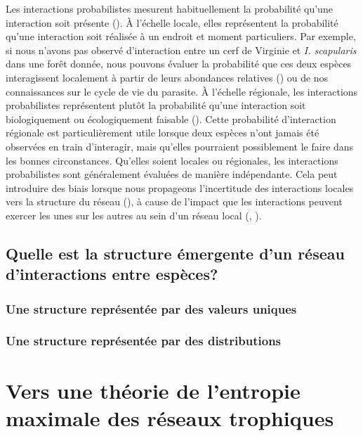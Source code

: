 Les interactions probabilistes mesurent habituellement la probabilité qu'une
interaction soit présente (\cite{Poisot2016Structure}). À l'échelle locale,
elles représentent la probabilité qu'une interaction soit réalisée à un endroit
et moment particuliers. Par exemple, si nous n'avons pas observé d'interaction
entre un cerf de Virginie et \textit{I. scapularis} dans une forêt donnée, nous
pouvons évaluer la probabilité que ces deux espèces interagissent localement à
partir de leurs abondances relatives (\cite{Canard2014Empirical}) ou de nos
connaissances sur le cycle de vie du parasite. À l'échelle régionale, les
interactions probabilistes représentent plutôt la probabilité qu'une interaction
soit biologiquement ou écologiquement faisable (\cite{Strydom2023Grapha}). Cette
probabilité d'interaction régionale est particulièrement utile lorsque deux
espèces n'ont jamais été observées en train d'interagir, mais qu'elles
pourraient possiblement le faire dans les bonnes circonstances. Qu'elles soient
locales ou régionales, les interactions probabilistes sont généralement évaluées
de manière indépendante. Cela peut introduire des biais lorsque nous propageons
l'incertitude des interactions locales vers la structure du réseau
(\cite{Poisot2016Structure}), à cause de l'impact que les interactions peuvent
exercer les unes sur les autres au sein d'un réseau local
(\cite{Golubski2011Modifying}, \cite{Ims2013Indirect}).


\subsection{Quelle est la structure émergente d'un réseau d'interactions entre espèces?} 

\subsubsection{Une structure représentée par des valeurs uniques} 

\subsubsection{Une structure représentée par des distributions} 



\section{Vers une théorie de l'entropie maximale des réseaux trophiques}

